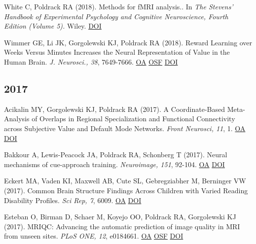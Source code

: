 White C, Poldrack RA (2018). Methods for fMRI analysis.. In \textit{The Stevens’ Handbook of Experimental Psychology and Cognitive Neuroscience, Fourth Edition (Volume 5).} Wiley. \href{http://dx.doi.org/10.1002/9781119170174.epcn515}{DOI} \vspace{2mm}

Wimmer GE, Li JK, Gorgolewski KJ, Poldrack RA (2018). Reward Learning over Weeks Versus Minutes Increases the Neural Representation of Value in the Human Brain. \textit{J. Neurosci., 38}, 7649-7666. \href{https://www.ncbi.nlm.nih.gov/pmc/articles/PMC6113901}{OA} \href{https://osf.io/z2gwf/}{OSF} \href{http://dx.doi.org/10.1523/jneurosci.0075-18.2018}{DOI} \vspace{2mm}

\subsection*{2017}

Acikalin MY, Gorgolewski KJ, Poldrack RA (2017). A Coordinate-Based Meta-Analysis of Overlaps in Regional Specialization and Functional Connectivity across Subjective Value and Default Mode Networks. \textit{Front Neurosci, 11}, 1. \href{https://www.ncbi.nlm.nih.gov/pmc/articles/PMC5243799}{OA} \href{http://dx.doi.org/10.3389/fnins.2017.00001}{DOI} \vspace{2mm}

Bakkour A, Lewis-Peacock JA, Poldrack RA, Schonberg T (2017). Neural mechanisms of cue-approach training. \textit{Neuroimage, 151}, 92-104. \href{https://www.ncbi.nlm.nih.gov/pmc/articles/PMC5365383}{OA} \href{http://dx.doi.org/10.1016/j.neuroimage.2016.09.059}{DOI} \vspace{2mm}

Eckert MA, Vaden KI, Maxwell AB, Cute SL, Gebregziabher M, Berninger VW (2017). Common Brain Structure Findings Across Children with Varied Reading Disability Profiles. \textit{Sci Rep, 7}, 6009. \href{https://www.ncbi.nlm.nih.gov/pmc/articles/PMC5519686}{OA} \href{http://dx.doi.org/10.1038/s41598-017-05691-5}{DOI} \vspace{2mm}

Esteban O, Birman D, Schaer M, Koyejo OO, Poldrack RA, Gorgolewski KJ (2017). MRIQC: Advancing the automatic prediction of image quality in MRI from unseen sites. \textit{PLoS ONE, 12}, e0184661. \href{https://www.ncbi.nlm.nih.gov/pmc/articles/PMC5612458}{OA} \href{https://osf.io/haf97/}{OSF} \href{http://dx.doi.org/10.1371/journal.pone.0184661}{DOI} \vspace{2mm}

